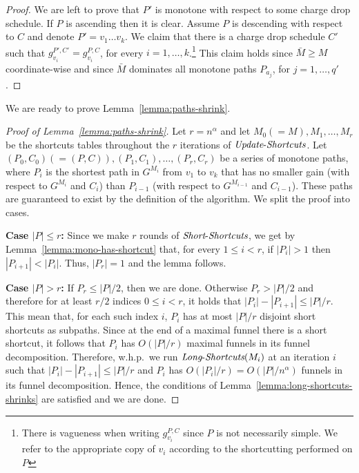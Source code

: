 \documentclass[11pt]{article}
\newcommand{\LS}{\mbox{{\it Long}-{\it Shortcuts}}}
\newcommand{\Simple}{\mbox{{\it Short}-{\it Shortcuts}}}
\newcommand{\UpdateS}{\mbox{{\it Update}-{\it Shortcuts}}}
\begin{document}
\begin{proof}
    We are left to prove that $P'$ is monotone with respect to some charge drop schedule. If $P$ is ascending then it is clear. Assume $P$ is descending with respect to $C$ and denote $P' = v_1\ldots v_k$. We 
    claim that there is a charge drop schedule $C'$ such that $g^{P',C'}_{v_i} = g^{P,C}_{v_i}$, for every $i=1,\ldots,k$.\footnote{There is vagueness when writing  $g^{P,C}_{v_i}$ since $P$ is not necessarily simple. We refer to the appropriate copy of $v_i$ according to the shortcutting performed on $P$} This claim holds since $\bar{M}\ge M$ coordinate-wise and since $\bar{M}$ dominates all monotone paths $P_{a_j}$, for $j=1,\ldots, q'$. 
\end{proof}




We are ready to prove Lemma~\ref{lemma:paths-shrink}.

\begin{proof}[Proof of Lemma~\ref{lemma:paths-shrink}]
    Let $r= n^\alpha$ and let $M_0(=M),M_1,\ldots, M_r$ be the shortcuts tables throughout the $r$ iterations of $\UpdateS$. Let $(P_0,C_0)(=(P,C)),(P_1,C_1),\ldots, (P_r,C_r)$ be a series of monotone paths, where $P_i$ is the shortest path in $G^{M_i}$ from $v_1$ to $v_k$ that has no smaller gain (with respect to $G^{M_i}$ and $C_i$) than $P_{i-1}$ (with respect to $G^{M_{i-1}}$ and $C_{i-1}$). These paths are guaranteed to exist by the definition of the algorithm. We split the proof into cases.
    
     \textbf{Case $|P|\le r$:} Since we make $r$ rounds of $\Simple$, we get by Lemma~\ref{lemma:mono-has-shortcut} that, for every $1\le i < r$, if $|P_i|>1$ then $|P_{i+1}| < |P_i|$. Thus, $|P_r|=1$ and the lemma follows.

    \textbf{Case $|P| > r$:} 
    If $P_r \le |P|/2$, then we are done. Otherwise $P_r > |P|/2$ and therefore for at least $r/2$ indices $0\le i< r$, it holds that $|P_i|-|P_{i+1}| \le |P|/r$. This mean that, for each such index $i$, $P_i$ has at most $|P|/r$ disjoint short shortcuts as subpaths. 
    Since at the end of a maximal funnel there is a short shortcut, it follows that $P_i$ has $O(|P|/r)$ maximal funnels in its funnel decomposition. Therefore, w.h.p.\, we run $\LS(M_i)$ at an iteration $i$ such that $|P_i|-|P_{i+1}| \le |P|/r$ and  $P_i$ has $O(|P_i|/r) = O(|P|/n^\alpha)$ funnels in its funnel decomposition. Hence, the conditions of Lemma~\ref{lemma:long-shortcuts-shrinks} are satisfied and we are done.
    
\end{proof}
\end{document}
